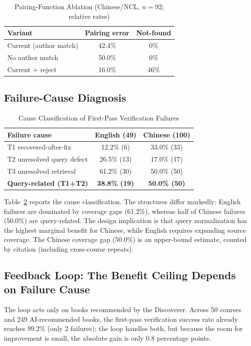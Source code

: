 \documentclass[conference]{IEEEtran}
\begin{document}
\begin{table}[t]
\caption{Pairing-Function Ablation (Chinese/NCL, $n=92$; relative rates)}
\label{tab:ablation}
\centering
\small
\setlength{\tabcolsep}{5pt}
\begin{tabular}{lcc}
\toprule
Variant & Pairing error & Not-found \\
\midrule
Current (author match) & 42.4\% & 0\%  \\
No author match        & 50.0\% & 0\%  \\
Current + reject       & 16.0\% & 46\% \\
\bottomrule
\end{tabular}
\end{table}

\subsection{Failure-Cause Diagnosis}
\begin{table}[t]
\caption{Cause Classification of First-Pass Verification Failures}
\label{tab:cause}
\centering
\small
\setlength{\tabcolsep}{4pt}
\begin{tabular}{lcc}
\toprule
Failure cause & English (49) & Chinese (100) \\
\midrule
T1 recovered-after-fix     & 12.2\% (6)  & 33.0\% (33) \\
T2 unresolved query defect & 26.5\% (13) & 17.0\% (17) \\
T3 unresolved retrieval    & 61.2\% (30) & 50.0\% (50) \\
\textbf{Query-related (T1+T2)} & \textbf{38.8\% (19)} & \textbf{50.0\% (50)} \\
\bottomrule
\end{tabular}
\end{table}

Table~\ref{tab:cause} reports the cause classification. The structures differ
markedly: English failures are dominated by coverage gaps (61.2\%), whereas half
of Chinese failures (50.0\%) are query-related. The design implication is that
query normalization has the highest marginal benefit for Chinese, while English
requires expanding source coverage. The Chinese coverage gap (50.0\%) is an
upper-bound estimate, counted by citation (including cross-course repeats).

\subsection{Feedback Loop: The Benefit Ceiling Depends on Failure Cause}
The loop acts only on books recommended by the Discoverer. Across 50 courses
and 249 AI-recommended books, the first-pass verification success rate already
reaches 99.2\% (only 2 failures); the loop handles both, but because the room
for improvement is small, the absolute gain is only 0.8 percentage points.
\end{document}
